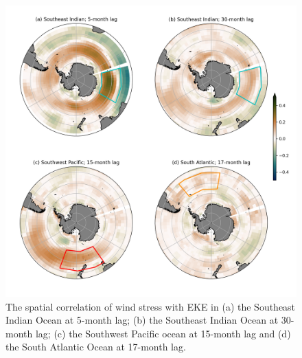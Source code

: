 \documentclass{agujournal2019}
\begin{document}
\begin{figure}[t]
\begin{center}
\includegraphics[width=\hsize]{Figure5}
\caption{The spatial correlation of wind stress with EKE in (a) the Southeast Indian Ocean at 5-month lag; (b) the Southeast Indian Ocean at 30-month lag; (c) the Southwest Pacific ocean at 15-month lag and (d) the South Atlantic Ocean at 17-month lag.}
\label{Fig:5}
\end{center}
\end{figure}
\end{document}
